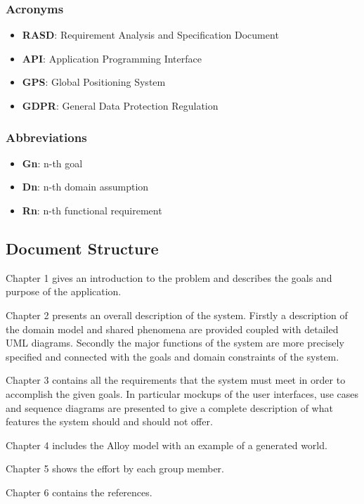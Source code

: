 \subsubsection{Acronyms}
\begin{itemize}
\item \textbf{RASD}: Requirement Analysis and Specification Document
\item \textbf{API}: Application Programming Interface
\item \textbf{GPS}: Global Positioning System
\item \textbf{GDPR}: General Data Protection Regulation
\end{itemize}

\subsubsection{Abbreviations}
\begin{itemize}
\item \textbf{Gn}: n-th goal
\item \textbf{Dn}: n-th domain assumption
\item \textbf{Rn}: n-th functional requirement
\end{itemize}

\subsection{Document Structure}
Chapter 1 gives an introduction to the problem and describes the goals and purpose of the application.

Chapter 2 presents an overall description of the system. Firstly a description of the domain model and shared phenomena are provided coupled with detailed UML diagrams. Secondly the major functions of the system are more precisely specified and connected with the goals and domain constraints of the system.

Chapter 3 contains all the requirements that the system must meet in order to accomplish the given goals. In particular mockups of the user interfaces, use cases and sequence diagrams are presented to give a complete description of what features the system should and should not offer.

Chapter 4 includes the Alloy model with an example of a generated world.

Chapter 5 shows the effort by each group member.

Chapter 6 contains the references.